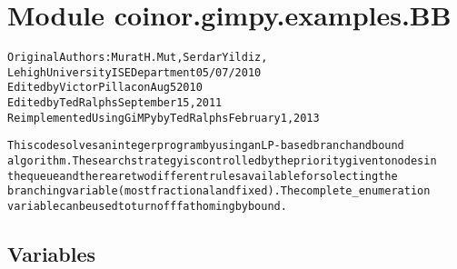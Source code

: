 %
%
%


\section{Module coinor.gimpy.examples.BB}

    \label{coinor:gimpy:examples:BB}
\begin{alltt}

Original Authors : Murat H. Mut, Serdar Yildiz,
                   Lehigh University ISE Department 05/07/2010
Edited by Victor Pillac on Aug 5 2010
Edited by Ted Ralphs September 15, 2011
Reimplemented Using GiMPy by Ted Ralphs February 1, 2013

This code solves an integer program by using an LP-based branch and bound
algorithm. The search strategy is controlled by the priority given to nodes in
the queue and there are two different rules available for solecting the
branching variable (most fractional and fixed). The complete\_enumeration
variable can be used to turn off fathoming by bound.
\end{alltt}



  \subsection{Variables}

